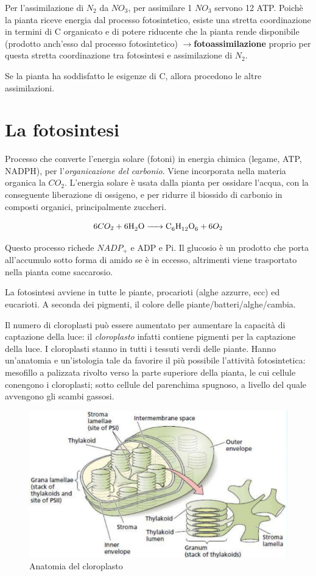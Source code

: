 \documentclass[a4paper,12pt]{book}
\newcommand{\lfreccia}{\ensuremath{\longrightarrow}}
\begin{document}
Per l'assimilazione di $N_{2}$ da $NO_{3}$, per assimilare 1 $NO_{3}$ servono 12 ATP. Poichè la pianta riceve energia dal processo fotosintetico, esiste una stretta coordinazione in termini di C organicato e di potere riducente che la pianta rende disponibile (prodotto anch'esso dal processo fotosintetico) \lfreccia \textbf{fotoassimilazione} proprio per questa stretta coordinazione tra fotosintesi e assimilazione di $N_{2}$.

Se la pianta ha soddisfatto le esigenze di C, allora procedono le altre assimilazioni.

\chapter{La fotosintesi}
Processo che converte l'energia solare (fotoni) in energia chimica (legame, ATP, NADPH), per l'\emph{organicazione del carbonio}. Viene incorporata nella materia organica la $CO_{2}$. L'energia solare è usata dalla pianta per ossidare l'acqua, con la conseguente liberazione di ossigeno, e per ridurre il biossido di carbonio in composti organici, principalmente zuccheri.

\begin{equation}
\ce{6 $CO_{2}$ + 6 H2O -> C6H12O6 + 6 $O_{2}$}
\end{equation}

Questo processo richede $NADP_{+}$ e ADP e Pi. Il glucosio è un prodotto che porta all'accumulo sotto forma di amido se è in eccesso, altrimenti viene trasportato nella pianta come saccarosio.

La fotosintesi avviene in tutte le piante, procarioti (alghe azzurre, ecc) ed eucarioti. A seconda dei pigmenti, il colore delle piante/batteri/alghe/cambia.

Il numero di cloroplasti può essere aumentato per aumentare la capacità di captazione della luce: il \emph{cloroplasto} infatti contiene pigmenti per la captazione della luce. I cloroplasti stanno in tutti i tessuti verdi delle piante. Hanno un'anatomia e un'istologia tale da favorire il più possibile l'attività fotosintetica: mesofillo a palizzata rivolto verso la parte superiore della pianta, le cui cellule conengono i cloroplasti; sotto cellule del parenchima spugnoso, a livello del quale avvengono gli scambi gassosi.
\begin{figure}[H]
\centering
\includegraphics[scale=0.35]{immagini/cloroplasto.jpg}
\caption{Anatomia del cloroplasto}
\end{figure}
\end{document}
